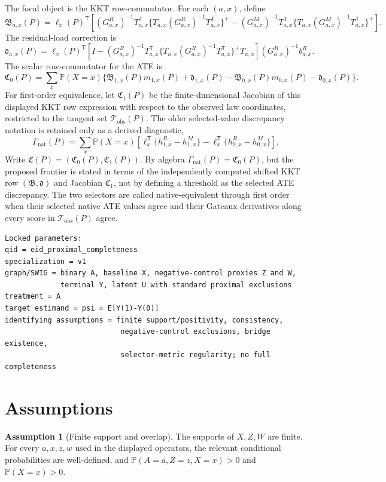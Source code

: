 \documentclass[11pt]{article}
\renewcommand{\Pr}{\mathbb{P}}
\newcommand{\transpose}{\mathsf{T}}
\theoremstyle{definition}
\newtheorem{assumption}{Assumption}
\theoremstyle{plain}
\theoremstyle{remark}
\begin{document}
The focal object is the KKT row-commutator. For each \((a,x)\), define
\[
\mathfrak B_{a,x}(P)=\ell_x(P)^\transpose\left[
(G^R_{a,x})^{-1}T_{a,x}^\transpose\{T_{a,x}(G^R_{a,x})^{-1}T_{a,x}^\transpose\}^+
-(G^M_{a,x})^{-1}T_{a,x}^\transpose\{T_{a,x}(G^M_{a,x})^{-1}T_{a,x}^\transpose\}^+
\right].
\]
The residual-load correction is
\[
\mathfrak d_{a,x}(P)=\ell_x(P)^\transpose
\left[I-(G^R_{a,x})^{-1}T_{a,x}^\transpose\{T_{a,x}(G^R_{a,x})^{-1}T_{a,x}^\transpose\}^+T_{a,x}\right]
(G^R_{a,x})^{-1}b^R_{a,x}.
\]
The scalar row-commutator for the ATE is
\[
\mathfrak C_0(P)=\sum_x\Pr(X=x)\{\mathfrak B_{1,x}(P)m_{1,x}(P)+\mathfrak d_{1,x}(P)-\mathfrak B_{0,x}(P)m_{0,x}(P)-\mathfrak d_{0,x}(P)\}.
\]
For first-order equivalence, let \(\mathfrak C_1(P)\) be the finite-dimensional Jacobian of this displayed KKT row expression with respect to the observed law coordinates, restricted to the tangent set \(\mathcal{T}_{\mathrm{obs}}(P)\). The older selected-value discrepancy notation is retained only as a derived diagnostic,
\[
\Gamma_{\mathrm{nat}}(P)=\sum_x \Pr(X=x)\left[\ell_x^\transpose\{h^R_{1,x}-h^M_{1,x}\}-\ell_x^\transpose\{h^R_{0,x}-h^M_{0,x}\}\right].
\]
Write \(\mathfrak C(P)=(\mathfrak C_0(P),\mathfrak C_1(P))\). By algebra \(\Gamma_{\mathrm{nat}}(P)=\mathfrak C_0(P)\), but the proposed frontier is stated in terms of the independently computed shifted KKT row \((\mathfrak B,\mathfrak d)\) and Jacobian \(\mathfrak C_1\), not by defining a threshold as the selected ATE discrepancy. The two selectors are called native-equivalent through first order when their selected native ATE values agree and their Gateaux derivatives along every score in \(\mathcal{T}_{\mathrm{obs}}(P)\) agree.

\begin{verbatim}
Locked parameters:
qid = eid_proximal_completeness
specialization = v1
graph/SWIG = binary A, baseline X, negative-control proxies Z and W,
             terminal Y, latent U with standard proximal exclusions
treatment = A
target estimand = psi = E[Y(1)-Y(0)]
identifying assumptions = finite support/positivity, consistency,
                           negative-control exclusions, bridge existence,
                           selector-metric regularity; no full completeness
\end{verbatim}

\section{Assumptions}
\begin{assumption}[Finite support and overlap]\label{ass:finite-overlap}
The supports of \(X,Z,W\) are finite. For every \(a,x,z,w\) used in the displayed operators, the relevant conditional probabilities are well-defined, and \(\Pr(A=a,Z=z,X=x)>0\) and \(\Pr(X=x)>0\).
\end{assumption}
\end{document}
